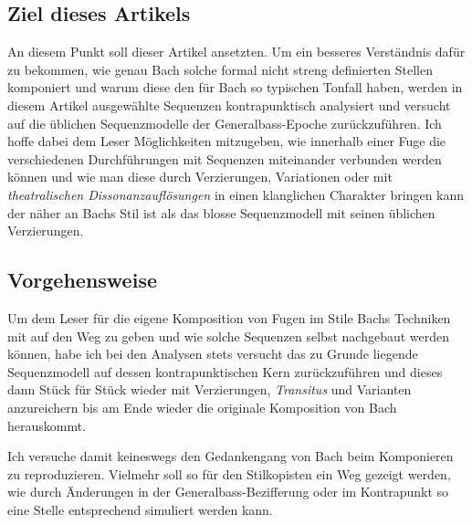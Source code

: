\subsection{Ziel dieses Artikels}

An diesem Punkt soll dieser Artikel ansetzten.
Um ein besseres Verständnis dafür zu bekommen, wie genau Bach solche formal nicht streng definierten Stellen komponiert und warum diese den für Bach so typischen Tonfall haben, werden in diesem Artikel ausgewählte Sequenzen kontrapunktisch analysiert und versucht auf die üblichen Sequenzmodelle der Generalbass-Epoche zurückzuführen.
Ich hoffe dabei dem Leser Möglichkeiten mitzugeben, wie innerhalb einer Fuge die verschiedenen Durchführungen mit Sequenzen miteinander verbunden werden können und wie man diese durch Verzierungen, Variationen oder mit \emph{theatralischen Dissonanzauflösungen}\autocite[208-219]{heinichen:general-bass,menke:kontrapunkt2} in einen klanglichen Charakter bringen kann der näher an Bachs Stil ist als das blosse Sequenzmodell mit seinen üblichen Verzierungen.


\subsection{Vorgehensweise}

Um dem Leser für die eigene Komposition von Fugen im Stile Bachs Techniken mit auf den Weg zu geben und wie solche Sequenzen selbst nachgebaut werden können, habe ich bei den Analysen stets versucht das zu Grunde liegende Sequenzmodell auf dessen kontrapunktischen Kern zurückzuführen und dieses dann Stück für Stück wieder mit Verzierungen, \emph{Transitus} und Varianten anzureichern bis am Ende wieder die originale Komposition von Bach herauskommt.

Ich versuche damit keineswegs den Gedankengang von Bach beim Komponieren zu reproduzieren.
Vielmehr soll so für den Stilkopisten ein Weg gezeigt werden, wie durch Änderungen in der Generalbass-Bezifferung oder im Kontrapunkt so eine Stelle entsprechend simuliert werden kann.

